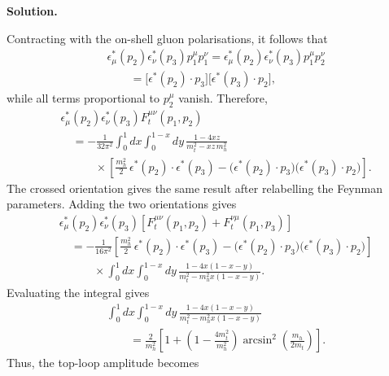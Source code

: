 \documentclass[a4paper,11pt]{article}
\newenvironment{solution}{\par\medskip\noindent\textbf{Solution.}\par\smallskip}{\par\medskip}
\begin{document}
\begin{solution}
Contracting with the on-shell gluon polarisations, it follows that
\begin{equation}
\begin{aligned}
&\epsilon_\mu^*(p_2)\epsilon_\nu^*(p_3)
p_1^\mu p_1^\nu
=
\epsilon_\mu^*(p_2)\epsilon_\nu^*(p_3)
p_1^\mu p_2^\nu
\\
&\qquad=
\bigl[\epsilon^*(p_2)\cdot p_3\bigr]
\bigl[\epsilon^*(p_3)\cdot p_2\bigr],
\end{aligned}
\end{equation}
while all terms proportional to $p_2^\mu$ vanish. Therefore,
\begin{equation}
\begin{aligned}
&\epsilon_\mu^*(p_2)\epsilon_\nu^*(p_3)
F_t^{\mu\nu}(p_1,p_2)
\\
&\quad=
-\frac{1}{32\pi^2}
\int_0^1dx\int_0^{1-x}dy\,
\frac{1-4xz}{m_t^2-xz\,m_h^2}
\\
&\qquad\quad\times
\left[
\frac{m_h^2}{2}\,
\epsilon^*(p_2)\cdot\epsilon^*(p_3)
-
\bigl(\epsilon^*(p_2)\cdot p_3\bigr)
\bigl(\epsilon^*(p_3)\cdot p_2\bigr)
\right].
\end{aligned}
\end{equation}
The crossed orientation gives the same result after relabelling the Feynman parameters. Adding the two orientations gives
\begin{equation}
\begin{aligned}
&\epsilon_\mu^*(p_2)\epsilon_\nu^*(p_3)
\left[
F_t^{\mu\nu}(p_1,p_2)+F_t^{\nu\mu}(p_1,p_3)
\right]
\\
&\quad=
-\frac{1}{16\pi^2}
\left[
\frac{m_h^2}{2}\,
\epsilon^*(p_2)\cdot\epsilon^*(p_3)
-
\bigl(\epsilon^*(p_2)\cdot p_3\bigr)
\bigl(\epsilon^*(p_3)\cdot p_2\bigr)
\right]
\\
&\qquad\quad\times
\int_0^1dx\int_0^{1-x}dy\,
\frac{1-4x(1-x-y)}
{m_t^2-m_h^2x(1-x-y)}.
\end{aligned}
\end{equation}
Evaluating the integral gives
\begin{equation}
\begin{aligned}
&\int_0^1dx\int_0^{1-x}dy\,
\frac{1-4x(1-x-y)}
{m_t^2-m_h^2x(1-x-y)}
\\
&\qquad=
\frac{2}{m_h^2}
\left[
1+\left(1-\frac{4m_t^2}{m_h^2}\right)
\arcsin^2\left(\frac{m_h}{2m_t}\right)
\right].
\end{aligned}
\end{equation}
Thus, the top-loop amplitude becomes
\begin{equation}
\begin{aligned}

\end{aligned}
\end{equation}
\end{solution}
\end{document}
